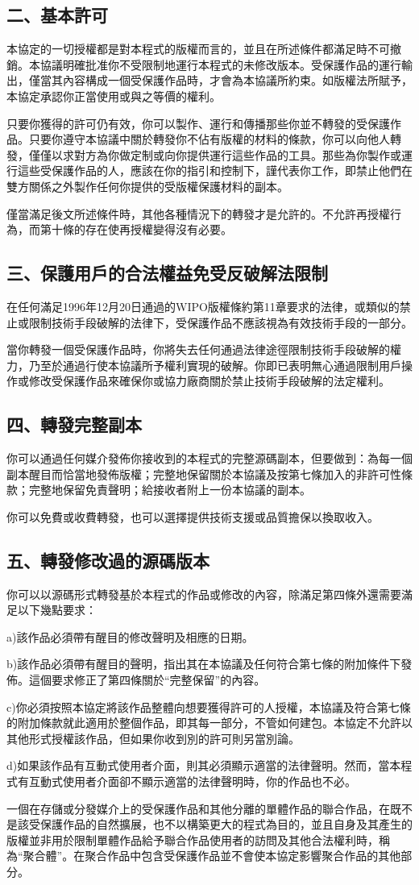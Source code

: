 \subsection{二、基本許可}
本協定的一切授權都是對本程式的版權而言的，並且在所述條件都滿足時不可撤銷。本協議明確批准你不受限制地運行本程式的未修改版本。受保護作品的運行輸出，僅當其內容構成一個受保護作品時，才會為本協議所約束。如版權法所賦予，本協定承認你正當使用或與之等價的權利。\par
只要你獲得的許可仍有效，你可以製作、運行和傳播那些你並不轉發的受保護作品。只要你遵守本協議中關於轉發你不佔有版權的材料的條款，你可以向他人轉發，僅僅以求對方為你做定制或向你提供運行這些作品的工具。那些為你製作或運行這些受保護作品的人，應該在你的指引和控制下，謹代表你工作，即禁止他們在雙方關係之外製作任何你提供的受版權保護材料的副本。\par
僅當滿足後文所述條件時，其他各種情況下的轉發才是允許的。不允許再授權行為，而第十條的存在使再授權變得沒有必要。
\subsection{三、保護用戶的合法權益免受反破解法限制}
在任何滿足1996年12月20日通過的WIPO版權條約第11章要求的法律，或類似的禁止或限制技術手段破解的法律下，受保護作品不應該視為有效技術手段的一部分。\par
當你轉發一個受保護作品時，你將失去任何通過法律途徑限制技術手段破解的權力，乃至於通過行使本協議所予權利實現的破解。你即已表明無心通過限制用戶操作或修改受保護作品來確保你或協力廠商關於禁止技術手段破解的法定權利。
\subsection{四、轉發完整副本}
你可以通過任何媒介發佈你接收到的本程式的完整源碼副本，但要做到：為每一個副本醒目而恰當地發佈版權；完整地保留關於本協議及按第七條加入的非許可性條款；完整地保留免責聲明；給接收者附上一份本協議的副本。\par
你可以免費或收費轉發，也可以選擇提供技術支援或品質擔保以換取收入。
\subsection{五、轉發修改過的源碼版本}
你可以以源碼形式轉發基於本程式的作品或修改的內容，除滿足第四條外還需要滿足以下幾點要求：\par
a)該作品必須帶有醒目的修改聲明及相應的日期。\par
b)該作品必須帶有醒目的聲明，指出其在本協議及任何符合第七條的附加條件下發佈。這個要求修正了第四條關於“完整保留”的內容。\par
c)你必須按照本協定將該作品整體向想要獲得許可的人授權，本協議及符合第七條的附加條款就此適用於整個作品，即其每一部分，不管如何建包。本協定不允許以其他形式授權該作品，但如果你收到別的許可則另當別論。\par
d)如果該作品有互動式使用者介面，則其必須顯示適當的法律聲明。然而，當本程式有互動式使用者介面卻不顯示適當的法律聲明時，你的作品也不必。\par
一個在存儲或分發媒介上的受保護作品和其他分離的單體作品的聯合作品，在既不是該受保護作品的自然擴展，也不以構築更大的程式為目的，並且自身及其產生的版權並非用於限制單體作品給予聯合作品使用者的訪問及其他合法權利時，稱為“聚合體”。在聚合作品中包含受保護作品並不會使本協定影響聚合作品的其他部分。
